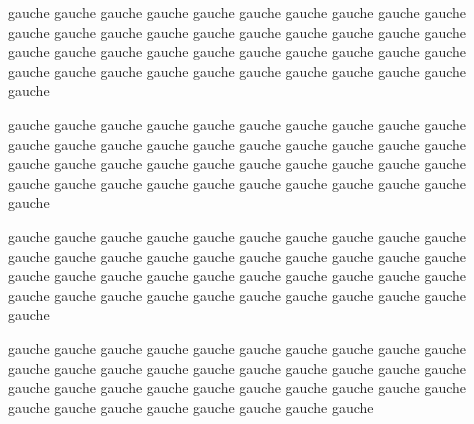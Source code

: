 \documentclass[12pt]{book}
\renewcommand{\edtext}[2]{}
\begin{document}
\begin{pages}
\begin{Leftside}
\beginnumbering
\pstart
\begin{ledgroup}
gauche gauche gauche gauche gauche gauche gauche gauche gauche gauche gauche gauche gauche gauche gauche gauche gauche gauche gauche gauche gauche gauche gauche gauche gauche gauche gauche gauche gauche gauche gauche gauche gauche gauche gauche gauche gauche gauche gauche gauche gauche\edtext{gauche}{\Afootnote{gauche gauche gauche gauche gauche gauche gauche gauche gauche gauche gauche gauche gauche gauche gauche gauche gauche gauche gauche gauche gauche gauche gauche gauche gauche gauche gauche gauche gauche gauche gauche gauche gauche gauche gauche }}

gauche gauche gauche gauche gauche gauche gauche gauche gauche gauche gauche gauche gauche gauche gauche gauche gauche gauche gauche gauche gauche gauche gauche gauche gauche gauche gauche gauche gauche gauche gauche gauche gauche gauche gauche gauche gauche gauche gauche gauche gauche\edtext{gauche}{\Afootnote{gauche gauche gauche gauche gauche gauche gauche gauche gauche gauche gauche gauche gauche gauche gauche gauche gauche gauche gauche gauche gauche gauche gauche gauche gauche gauche gauche gauche gauche gauche gauche gauche gauche gauche gauche }}
\end{ledgroup}
\pend

\pstart
\begin{ledgroup}
gauche gauche gauche gauche gauche gauche gauche gauche gauche gauche gauche gauche gauche gauche gauche gauche gauche gauche gauche gauche gauche gauche gauche gauche gauche gauche gauche gauche gauche gauche gauche gauche gauche gauche gauche gauche gauche gauche gauche gauche gauche\edtext{gauche}{\Afootnote{gauche gauche gauche gauche gauche gauche gauche gauche gauche gauche gauche gauche gauche gauche gauche gauche gauche gauche gauche gauche gauche gauche gauche gauche gauche gauche gauche gauche gauche gauche gauche gauche gauche gauche gauche}}

gauche gauche gauche gauche gauche gauche gauche gauche gauche gauche gauche gauche gauche gauche gauche gauche gauche gauche gauche gauche gauche gauche gauche gauche gauche gauche gauche gauche gauche gauche gauche gauche gauche gauche gauche gauche gauche gauche\edtext{gauche}{\Afootnote{gauche gauche gauche gauche gauche gauche gauche gauche gauche gauche gauche gauche gauche gauche gauche gauche gauche gauche gauche gauche gauche gauche gauche gauche gauche gauche gauche gauche gauche gauche gauche gauche gauche gauche gauche}}


\end{ledgroup}
\end{Leftside}
\end{pages}
\end{document}
